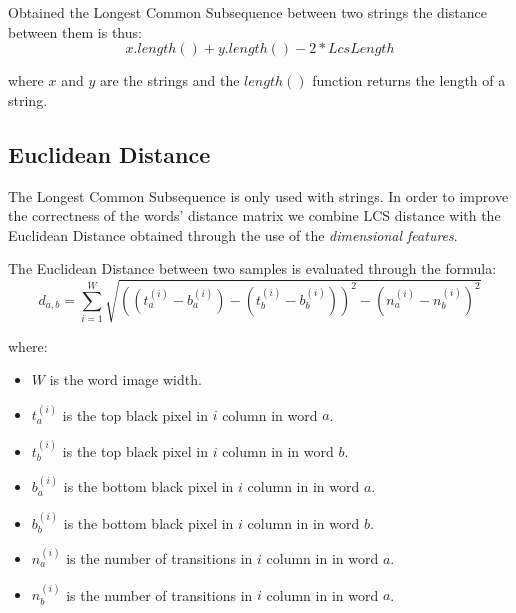 Obtained the Longest Common Subsequence between two strings the distance between them is thus:
$$ x.length() + y.length() - 2*LcsLength$$

where $x$ and $y$ are the strings and the $length()$ function returns the length of a string.

\subsection{Euclidean Distance} 

The Longest Common Subsequence is only used with strings. In order to improve the correctness of the words' distance matrix we combine LCS distance with the Euclidean Distance obtained through the use of the \textit{dimensional features}.

The Euclidean Distance between two samples is evaluated through the formula:
$$d_{a,b} = \sum_{i = 1}^{W} \sqrt{((t_{a}^{(i)} - b_{a}^{(i)}) - (t_{b}^{(i)} - b_{b}^{(i)}))^2 - (n_{a}^{(i)} - n_{b}^{(i)})^2}$$

where:
\begin{itemize}
\item $W$ is the word image width.
\item $t_{a}^{(i)}$ is the top black pixel in $i$ column in word $a$.
\item $t_{b}^{(i)}$ is the top black pixel in $i$ column in in word $b$.
\item $b_{a}^{(i)}$ is the bottom black pixel in $i$ column in in word $a$.
\item $b_{b}^{(i)}$ is the bottom black pixel in $i$ column in in word $b$.
\item $n_{a}^{(i)}$ is the number of transitions in $i$ column in in word $a$.
\item $n_{b}^{(i)}$ is the number of transitions in $i$ column in in word $a$.
\end{itemize}
